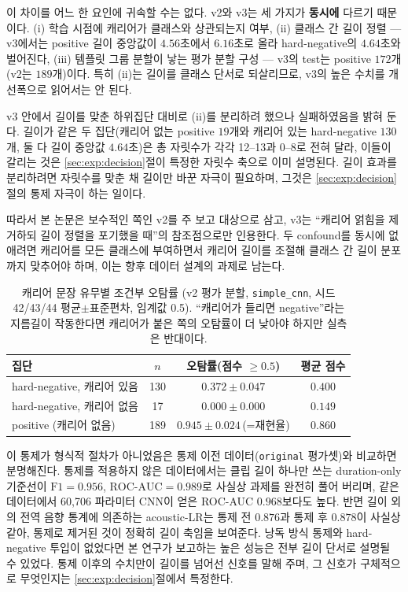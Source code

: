 \documentclass[11pt]{article}
\renewcommand{\emph}[1]{\textbf{#1}}
\begin{document}
이 차이를 어느 한 요인에 귀속할 수는 없다. v2와 v3는 세 가지가 \emph{동시에} 다르기 때문이다.
(i) 학습 시점에 캐리어가 클래스와 상관되는지 여부, (ii) 클래스 간 길이 정렬 — v3에서는 positive
길이 중앙값이 $4.56$초에서 $6.16$초로 올라 hard-negative의 $4.64$초와 벌어진다, (iii) 템플릿
그룹 분할이 낳는 평가 분할 구성 — v3의 test는 positive $172$개(v2는 $189$개)이다. 특히 (ii)는
길이를 클래스 단서로 되살리므로, v3의 높은 수치를 개선폭으로 읽어서는 안 된다.

v3 안에서 길이를 맞춘 하위집단 대비로 (ii)를 분리하려 했으나 실패하였음을 밝혀 둔다. 길이가
같은 두 집단(캐리어 없는 positive $19$개와 캐리어 있는 hard-negative $130$개, 둘 다 길이
중앙값 $4.64$초)은 총 자릿수가 각각 12--13과 0--8로 전혀 달라, 이들이 갈리는 것은
\ref{sec:exp:decision}절이 특정한 자릿수 축으로 이미 설명된다. 길이 효과를 분리하려면 자릿수를
맞춘 채 길이만 바꾼 자극이 필요하며, 그것은 \ref{sec:exp:decision}절의 통제 자극이 하는 일이다.

따라서 본 논문은 보수적인 쪽인 v2를 주 보고 대상으로 삼고, v3는 ``캐리어 얽힘을 제거하되 길이
정렬을 포기했을 때''의 참조점으로만 인용한다. 두 confound를 동시에 없애려면 캐리어를 모든
클래스에 부여하면서 캐리어 길이를 조절해 클래스 간 길이 분포까지 맞추어야 하며, 이는 향후
데이터 설계의 과제로 남는다.

\begin{table}[!htbp]
\centering
\caption{캐리어 문장 유무별 조건부 오탐률 (v2 평가 분할, \texttt{simple\_cnn}, 시드 42/43/44
평균$\pm$표준편차, 임계값 0.5). ``캐리어가 들리면 negative''라는 지름길이 작동한다면 캐리어가
붙은 쪽의 오탐률이 더 낮아야 하지만 실측은 반대이다.}
\label{tab:carrier}
\small
\begin{tabular}{lccc}
\toprule
집단 & $n$ & 오탐률(점수 $\ge 0.5$) & 평균 점수 \\
\midrule
hard-negative, 캐리어 있음 & 130 & $0.372\pm0.047$ & $0.400$ \\
hard-negative, 캐리어 없음 & 17  & $\mathbf{0.000\pm0.000}$ & $0.149$ \\
positive (캐리어 없음)      & 189 & $0.945\pm0.024$\,(=재현율) & $0.860$ \\
\bottomrule
\end{tabular}
\end{table}

이 통제가 형식적 절차가 아니었음은 통제 이전 데이터(\texttt{original} 평가셋)와 비교하면
분명해진다. 통제를 적용하지 않은 데이터에서는 클립 길이 하나만 쓰는 duration-only 기준선이
$\text{F1}=0.956$, $\text{ROC-AUC}=0.989$로 사실상 과제를 완전히 풀어 버리며, 같은 데이터에서
60{,}706 파라미터 CNN이 얻은 ROC-AUC $0.968$보다도 높다. 반면 길이 외의 전역 음향 통계에
의존하는 acoustic-LR는 통제 전 $0.876$과 통제 후 $0.878$이 사실상 같아, 통제로 제거된 것이
정확히 길이 축임을 보여준다. 낭독 방식 통제와 hard-negative 투입이 없었다면 본 연구가 보고하는
높은 성능은 전부 길이 단서로 설명될 수 있었다. 통제 이후의 수치만이 길이를 넘어선 신호를
말해 주며, 그 신호가 구체적으로 무엇인지는 \ref{sec:exp:decision}절에서 특정한다.
\end{document}
